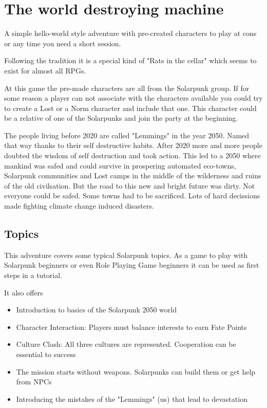 \chapter{The world destroying machine}

A simple hello-world style adventure with pre-created characters to play at cons or any time you need a short session.

Following the tradition it is a special kind of "Rats in the cellar" which seems to exist for almost all RPGs.

At this game the pre-made characters are all from the Solarpunk group. If for some reason a player can not associate with the characters available you could try to create a Lost or a Norm character and include that one. This character could be a relative of one of the Solarpunks and join the party at the beginning.

\begin{sidebarBox}[title=Dirty Road to Eden]

The people living before 2020 are called "Lemmings" in the year 2050. Named that way thanks to their self destructive habits. After 2020 more and more people doubted the wisdom of self destruction and took action. This led to a 2050 where mankind was safed and could survive in prospering automated eco-towns, Solarpunk communities and Lost camps in the middle of the wilderness and ruins of the old civilsation. But the road to this new and bright future was dirty. Not everyone could be safed. Some towns had to be sacrificed. Lots of hard decissions made fighting climate change induced disasters. 

\end{sidebarBox}

\section{Topics}

This adventure covers some typical Solarpunk topics. As a game to play with Solarpunk beginners or even Role Playing Game beginners it can be used as first steps in a tutorial.

It also offers

\begin{itemize}
\item Introduction to basics of the Solarpunk 2050 world
\item Character Interaction: Players must balance interests to earn Fate Points
\item Culture Clash: All three cultures are represented. Cooperation can be essential to success
\item The mission starts without weapons. Solarpunks can build them or get help from NPCs
\item Introducing the mistakes of the "Lemmings" (us) that lead to devastation
\end{itemize}

